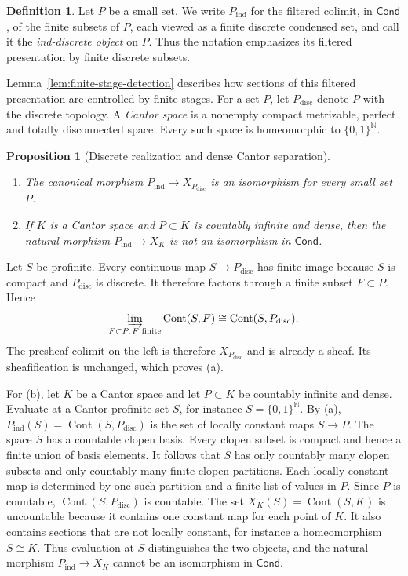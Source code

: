 \documentclass[10pt]{amsart}
\makeatletter
\newcommand{\Cond}{\mathsf{Cond}}
\newcommand{\Cont}{\operatorname{Cont}}
\newcommand{\N}{\mathbb{N}}
\theoremstyle{plain}
\newtheorem{proposition}[theorem]{Proposition}
\theoremstyle{definition}
\newtheorem{definition}[theorem]{Definition}
\renewenvironment{proof}[1][\proofname]{\par
  \pushQED{\qed}%
  \normalfont \topsep6\p@\@plus6\p@\relax
  \trivlist
  \item[\hskip\labelsep\itshape #1\@addpunct{:}]\ignorespaces
}{%
  \popQED\endtrivlist\@endpefalse
}
\makeatother
\begin{document}
\begin{definition}
\label{def:ind}
Let $P$ be a small set. We write $P_{\mathrm{ind}}$ for the filtered
colimit, in $\Cond$, of the finite subsets of $P$, each viewed as a finite
discrete condensed set, and call it the \emph{ind-discrete object} on $P$. Thus
the notation emphasizes its filtered presentation by finite discrete subsets.
\end{definition}

Lemma~\ref{lem:finite-stage-detection} describes how sections of this filtered
presentation are controlled by finite stages. For a set $P$, let
$P_{\mathrm{disc}}$ denote $P$ with the discrete topology. A \emph{Cantor
space} is a nonempty compact metrizable, perfect and totally disconnected
space. Every such space is homeomorphic to $\{0,1\}^{\N}$.

\begin{proposition}[Discrete realization and dense Cantor separation]
\label{prop:discrete-compact}
\leavevmode
\begin{enumerate}[label=\textnormal{(\alph*)},leftmargin=2.2em]
\item The canonical morphism $P_{\mathrm{ind}}\to X_{P_{\mathrm{disc}}}$ is an
isomorphism for every small set $P$.
\item If $K$ is a Cantor space and $P\subset K$ is countably infinite and dense,
then the natural morphism $P_{\mathrm{ind}}\to X_K$ is not an isomorphism in
$\Cond$.
\end{enumerate}
\end{proposition}

\begin{proof}
Let $S$ be profinite. Every continuous map $S\to P_{\mathrm{disc}}$ has finite
image because $S$ is compact and $P_{\mathrm{disc}}$ is discrete. It therefore
factors through a finite subset $F\subset P$. Hence
\[
  \varinjlim_{F\subset P,\,F\text{ finite}}\Cont(S,F)
  \cong \Cont(S,P_{\mathrm{disc}}).
\]
The presheaf colimit on the left is therefore $X_{P_{\mathrm{disc}}}$ and is
already a sheaf. Its sheafification is unchanged, which proves (a).

For (b), let $K$ be a Cantor space and let $P\subset K$ be
countably infinite and dense.
Evaluate at a Cantor profinite set $S$, for instance $S=\{0,1\}^{\N}$.
By (a), $P_{\mathrm{ind}}(S)=\Cont(S,P_{\mathrm{disc}})$ is the set of locally
constant maps $S\to P$. The space $S$ has a countable clopen basis. Every
clopen subset is compact and hence a finite union of basis elements. It follows
that $S$ has only countably many clopen subsets and only countably many finite
clopen partitions. Each locally constant map is determined by one such
partition and a finite list of values in $P$. Since $P$ is countable,
$\Cont(S,P_{\mathrm{disc}})$ is countable. The set
$X_K(S)=\Cont(S,K)$ is uncountable because it contains one constant map for
each point of $K$. It also contains sections that are not locally constant,
for instance a homeomorphism $S\cong K$. Thus evaluation at
$S$ distinguishes the two objects, and the natural morphism
$P_{\mathrm{ind}}\to X_K$ cannot be an isomorphism in $\Cond$.
\end{proof}
\end{document}
